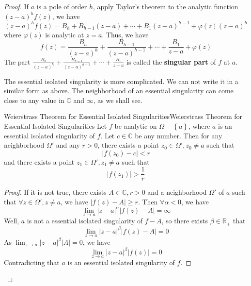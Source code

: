 \documentclass[../main.tex]{subfiles}
\begin{document}
\begin{proof}
If $a$ is a pole of order $h$, apply Taylor's theorem to the analytic function $(z-a)^hf(z)$, we have
\begin{equation*}
	(z-a)^hf(z) = B_h + B_{h-1}(z-a) + \cdots + B_1(z-a)^{h-1} + \varphi(z) (z-a)^h
\end{equation*}
where $\varphi(z)$ is analytic at $z=a$. Thus, we have
\begin{equation}
	f(z) = \frac{B_h}{(z-a)^h} + \frac{B_{h-1}}{(z-a)^{h-1}} + \cdots + \frac{B_1}{z-a} + \varphi(z)
\end{equation}
The part $\displaystyle \frac{B_h}{(z-a)^h} + \frac{B_{h-1}}{(z-a)^{h-1}} + \cdots + \frac{B_1}{z-a}$ is called the \textbf{singular part} of $f$ at $a$.


The essential isolated singularity is more complicated. We can not write it in a similar form as above. The neighborhood of an essential singularity can come close to any value in $\mathbb{C}$ and $\infty $, as we shall see.

\begin{theorem}{Weierstrass Theorem for Essential Isolated Singularities}{Weierstrass Theorem for Essential Isolated Singularities}
	Let $f$ be analytic on $\Omega-\left\{ a \right\}$, where $a$ is an essential isolated singularity of $f$. Let $c\in \mathbb{C}$ be any number. Then for any neighborhood $\Omega'$ and any $r>0$, there exists a point $z_0\in \Omega',z_0\neq a$ such that
	\begin{equation*}
		\left|f(z_0)-c\right| < r
	\end{equation*}
	and there exists a point $z_1\in \Omega',z_1\neq a$ such that
	\begin{equation*}
		\left|f(z_1)\right| > \frac{1}{r}
	\end{equation*}
\end{theorem}
\begin{proof}
	If it is not true, there exists $A\in \mathbb{C},r>0$ and a neighborhood $\Omega'$ of $a$ such that $\forall z\in \Omega',z\neq a$, we have $\left|f(z)-A\right| \geq r$. Then $\forall \alpha<0$, we have
	\begin{equation*}
		\lim_{z \to a} \left|z-a\right|^{\alpha} \left|f(z)-A\right| = \infty 
	\end{equation*}
	Well, $a$ is not a essential isolated singularity of $f-A$, so there exists $\beta\in \mathbb{R}_+$ that
	\begin{equation*}
		\lim_{z \to a} \left|z-a\right|^{\beta} \left|f(z)-A\right| = 0
	\end{equation*}
	As $\lim_{z \to a} \left|z-a\right|^{\beta}\left|A\right| = 0$, we have
	\begin{equation*}
		\lim_{z \to a} \left|z-a\right|^{\beta} \left|f(z)\right| = 0
	\end{equation*}
	Contradicting that $a$ is an essential isolated singularity of $f$.


\end{proof}
\end{proof}
\end{document}
